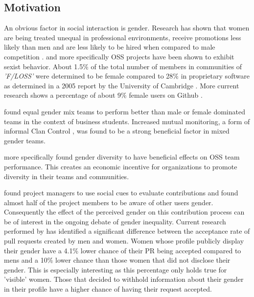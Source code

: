 \subsection{Motivation}%
An obvious factor in social interaction is gender. Research has shown that women are being treated unequal in professional environments, receive promotions less likely than men and are less likely to be hired when compared to male competition \cite{Davison2000225, doi:10.1177/0149206310374774}.
and more specifically \ac{OSS} projects have been shown to exhibit sexist behavior. About 1.5\% of the total number of members in communities of \emph{'\ac{F/LOSS}'} were determined to be female compared to 28\% in proprietary software as determined in a 2005 report by the University of Cambridge \cite{flosspols-gender:2005}. More current research shows a percentage of about 9\% female users on Github \cite{Vasilescu:2015:GTD:2702123.2702549}.

\citeauthor{10.2307/23443867} found equal gender mix teams to perform better than male or female dominated teams in the context of business students. Increased mutual monitoring, a form of informal Clan Control \cite{doi:10.1287/orsc.7.1.1}, was found to be a strong beneficial factor in mixed gender teams.

\citeauthor{Vasilescu:2015:GTD:2702123.2702549} more specifically found gender diversity to have beneficial effects on \ac{OSS} team performance. This creates an economic incentive for organizations to promote diversity in their teams and communities.

\citeauthor{Tsay:2014:IST:2568225.2568315} found project managers to use social cues to evaluate contributions and \citeauthor{Vasilescu:2015:GTD:2702123.2702549} found almost half of the project members to be aware of other users gender. Consequently the effect of the perceived gender on this contribution process can be of interest in the ongoing debate of gender inequality. Current research performed by \citeauthor{genderdiff:2016} has identified a significant difference between the acceptance rate of pull requests created by men and women. Women whose profile publicly display their gender have a 4.1\% lower chance of their \ac{PR} being accepted compared to mens and a 10\% lower chance than those women that did not disclose their gender. This is especially interesting as this percentage only holds true for 'visible'
women. Those that decided to withhold information about their gender in their profile have a higher chance of having their request accepted.


